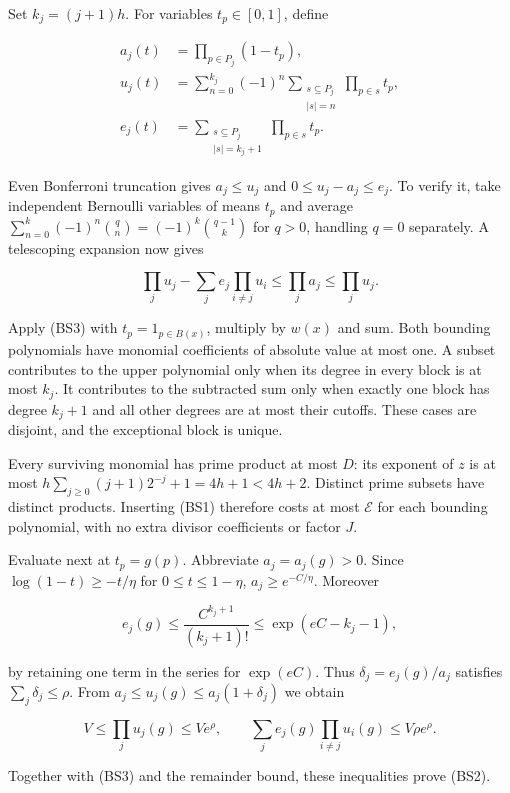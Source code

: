 Set \(k_j=(j+1)h\). For variables \(t_p\in[0,1]\), define

\[
\begin{aligned}
a_j(t)&=\prod_{p\in P_j}(1-t_p),\\
u_j(t)&=\sum_{n=0}^{k_j}(-1)^n
             \sum_{\substack{s\subseteq P_j\\|s|=n}}\prod_{p\in s}t_p,\\
e_j(t)&=\sum_{\substack{s\subseteq P_j\\|s|=k_j+1}}\prod_{p\in s}t_p.
\end{aligned}
\]

Even Bonferroni truncation gives \(a_j\le u_j\) and
\(0\le u_j-a_j\le e_j\). To verify it, take independent Bernoulli
variables of means \(t_p\) and average
\(\sum_{n=0}^k(-1)^n\binom{q}{n}=(-1)^k\binom{q-1}{k}\) for \(q>0\),
handling \(q=0\) separately. A telescoping expansion now gives

\[
\prod_j u_j-\sum_j e_j\prod_{i\ne j}u_i
 \le\prod_j a_j\le\prod_j u_j. \tag{BS3}
\]

Apply (BS3) with \(t_p=1_{p\in B(x)}\), multiply by \(w(x)\) and sum.
Both bounding polynomials have monomial coefficients of absolute value
at most one. A subset contributes to the upper polynomial only when its
degree in every block is at most \(k_j\). It contributes to the
subtracted sum only when exactly one block has degree \(k_j+1\) and all
other degrees are at most their cutoffs. These cases are disjoint, and
the exceptional block is unique.

Every surviving monomial has prime product at most \(D\): its exponent
of \(z\) is at most \(h\sum_{j\ge0}(j+1)2^{-j}+1=4h+1<4h+2\). Distinct
prime subsets have distinct products. Inserting (BS1) therefore costs at
most \(\mathcal E\) for each bounding polynomial, with no extra divisor
coefficients or factor \(J\).

Evaluate next at \(t_p=g(p)\). Abbreviate \(a_j=a_j(g)>0\). Since
\(\log(1-t)\ge-t/\eta\) for \(0\le t\le1-\eta\), \(a_j\ge e^{-C/\eta}\).
Moreover

\[
e_j(g)\le\frac{C^{k_j+1}}{(k_j+1)!}\le\exp(eC-k_j-1),
\]

by retaining one term in the series for \(\exp(eC)\). Thus
\(\delta_j=e_j(g)/a_j\) satisfies \(\sum_j\delta_j\le\rho\). From
\(a_j\le u_j(g)\le a_j(1+\delta_j)\) we obtain

\[
V\le\prod_j u_j(g)\le Ve^\rho,
\qquad
\sum_j e_j(g)\prod_{i\ne j}u_i(g)\le V\rho e^\rho.
\]

Together with (BS3) and the remainder bound, these inequalities prove
(BS2).

